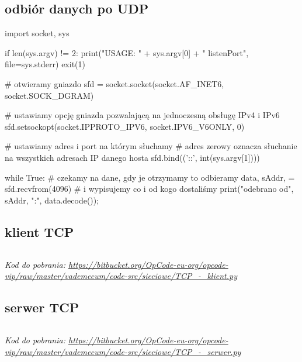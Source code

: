\subsection{odbiór danych po UDP}
\begin{CodeFrame*}[python]{}
import socket, sys

if len(sys.argv) != 2:
  print("USAGE: " + sys.argv[0] + " listenPort", file=sys.stderr)
  exit(1)

# otwieramy gniazdo
sfd = socket.socket(socket.AF_INET6, socket.SOCK_DGRAM)

# ustawiamy opcję gniazda pozwalającą na jednoczesną obsługę IPv4 i IPv6
sfd.setsockopt(socket.IPPROTO_IPV6, socket.IPV6_V6ONLY, 0)

# ustawiamy adres i port na którym słuchamy
# adres zerowy oznacza słuchanie na wszystkich adresach IP danego hosta
sfd.bind(('::', int(sys.argv[1])))

while True:
  # czekamy na dane, gdy je otrzymamy to odbieramy
  data, sAddr, = sfd.recvfrom(4096)
  # i wypisujemy co i od kogo dostaliśmy
  print("odebrano od", sAddr, ":", data.decode());
\end{CodeFrame*}

\subsection{klient TCP}
\inputminted[frame=single,tabsize=2]{python}{vip-code-src/sieciowe/TCP_-_klient.py}
\textit{Kod do pobrania: \url{https://bitbucket.org/OpCode-eu-org/opcode-vip/raw/master/vademecum/code-src/sieciowe/TCP_-_klient.py}}

\subsection{serwer TCP}
\inputminted[frame=single,tabsize=2]{python}{vip-code-src/sieciowe/TCP_-_serwer.py}
\textit{Kod do pobrania: \url{https://bitbucket.org/OpCode-eu-org/opcode-vip/raw/master/vademecum/code-src/sieciowe/TCP_-_serwer.py}}
